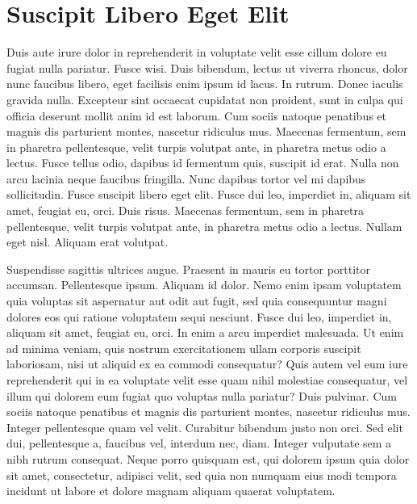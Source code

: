 \chapter{Suscipit Libero Eget Elit}
Duis aute irure dolor in reprehenderit in voluptate velit esse cillum dolore eu fugiat nulla pariatur. Fusce wisi. Duis bibendum, lectus ut viverra rhoncus, dolor nunc faucibus libero, eget facilisis enim ipsum id lacus. In rutrum. Donec iaculis gravida nulla. Excepteur sint occaecat cupidatat non proident, sunt in culpa qui officia deserunt mollit anim id est laborum. Cum sociis natoque penatibus et magnis dis parturient montes, nascetur ridiculus mus. Maecenas fermentum, sem in pharetra pellentesque, velit turpis volutpat ante, in pharetra metus odio a lectus. Fusce tellus odio, dapibus id fermentum quis, suscipit id erat. Nulla non arcu lacinia neque faucibus fringilla. Nunc dapibus tortor vel mi dapibus sollicitudin. Fusce suscipit libero eget elit. Fusce dui leo, imperdiet in, aliquam sit amet, feugiat eu, orci. Duis risus. Maecenas fermentum, sem in pharetra pellentesque, velit turpis volutpat ante, in pharetra metus odio a lectus. Nullam eget nisl. Aliquam erat volutpat.

Suspendisse sagittis ultrices augue. Praesent in mauris eu tortor porttitor accumsan. Pellentesque ipsum. Aliquam id dolor. Nemo enim ipsam voluptatem quia voluptas sit aspernatur aut odit aut fugit, sed quia consequuntur magni dolores eos qui ratione voluptatem sequi nesciunt. Fusce dui leo, imperdiet in, aliquam sit amet, feugiat eu, orci. In enim a arcu imperdiet malesuada. Ut enim ad minima veniam, quis nostrum exercitationem ullam corporis suscipit laboriosam, nisi ut aliquid ex ea commodi consequatur? Quis autem vel eum iure reprehenderit qui in ea voluptate velit esse quam nihil molestiae consequatur, vel illum qui dolorem eum fugiat quo voluptas nulla pariatur? Duis pulvinar. Cum sociis natoque penatibus et magnis dis parturient montes, nascetur ridiculus mus. Integer pellentesque quam vel velit. Curabitur bibendum justo non orci. Sed elit dui, pellentesque a, faucibus vel, interdum nec, diam. Integer vulputate sem a nibh rutrum consequat. Neque porro quisquam est, qui dolorem ipsum quia dolor sit amet, consectetur, adipisci velit, sed quia non numquam eius modi tempora incidunt ut labore et dolore magnam aliquam quaerat voluptatem.

